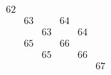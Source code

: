 \documentclass{amsart}
\begin{document}
\begin{align*}
\begin{array}{r||c|c|c}
\begin{array}{c|c|c|c|c}
 &  &  &  &  \\
 &  &  &  &  \\
 &  &  &  &  \\
 &  &  &  &  \\
\end{array}
&&
   \begin{array}{cccccc}
62 &  &  &  &  &  \\
 & 63 &  & 64 &  &  \\
 &  & 63 &  & 64 &  \\
 & 65 &  & 66 &  &  \\
 &  & 65 &  & 66 &  \\
 &  &  &  &  & 67 \\
   \end{array}
  \end{array}
\end{align*}
\end{document}
